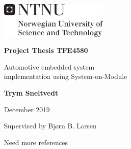 \documentclass[11pt]{article}
\begin{document}
\begin{titlepage}
    
    \includegraphics[width=0.4\textwidth]{media/ntnu_hovedlogo_eng_svart.png}
    
    \vspace{1cm}
    \huge
    
    \textbf{Project Thesis TFE4580}
 
    \vspace{0.5cm}
    
    Automotive embedded system\\ 
    implementation using System-on-Module
 
    \vspace{1.5cm}
    \Large
    
    \textbf{Trym Sneltvedt}

    \vfill

    December 2019
    
    \vspace{0.5cm}

    Supervised by Bjørn B. Larsen
\end{titlepage}


\newpage


\tableofcontents

\newpage












\printbibliography

{\color{red}Need more references}

\newpage




\end{document}
